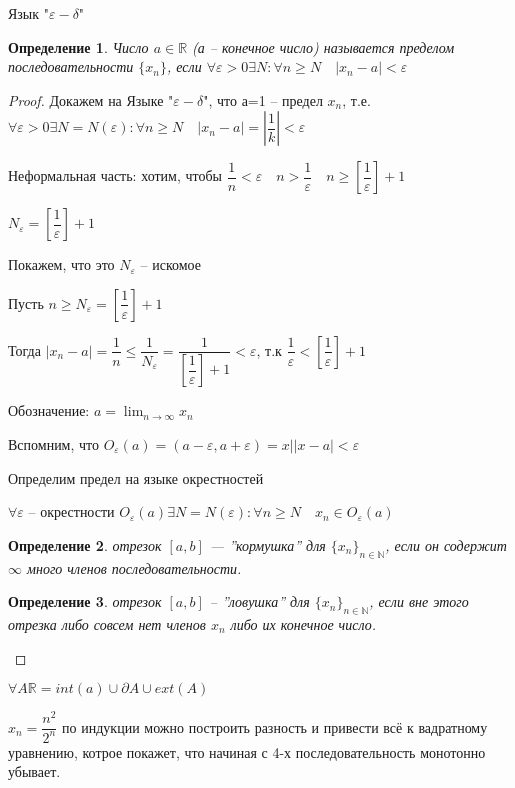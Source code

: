 \documentclass{book}
\newtheorem{Def}{Определение}[chapter]
\begin{document}
Язык  "$\varepsilon - \delta$"

\begin{Def}
	Число $a\in \mathds{R} $ (а -- конечное число) называется пределом последовательности $\{x_n\}$, если $\forall \varepsilon >0\exists N:\forall n \geqslant N \quad |x_n -a|<\varepsilon$
\end{Def}
\begin{proof}
	Докажем на Языке  "$\varepsilon - \delta$", что а=1 -- предел $x_n$, т.е. $\forall \varepsilon >0 \exists N = N(\varepsilon ):\forall n \geqslant N \quad |x_n -a|= |\dfrac{1}{k}|<\varepsilon$
	
	Неформальная часть: хотим, чтобы $\dfrac{1}{n}<\varepsilon\quad n>\dfrac{1}{\varepsilon}\quad n \geqslant \left[ \dfrac{1}{\varepsilon}\right] +1 $
	
	$N_{\varepsilon} = \left[ \dfrac{1}{\varepsilon}\right] +1$
	
	Покажем, что это  $N_{\varepsilon}$ -- искомое
	
	Пусть $n\geqslant N_{\varepsilon} = \left[ \dfrac{1}{\varepsilon}\right] +1$
	
	Тогда $|x_n-a|=\dfrac{1}{n} \leqslant \dfrac{1}{N_{\varepsilon}} = \dfrac{1}{\left[ \dfrac{1}{\varepsilon}\right] +1}<\varepsilon$, т.к $\dfrac{1}{\varepsilon}<\left[ \dfrac{1}{\varepsilon}\right] +1$
	
	Обозначение: $a = \lim_{n\rightarrow \infty}x_n$
	
	Вспомним, что $O_{\varepsilon}(a)=(a-\varepsilon, a+\varepsilon) = {x||x-a|<\varepsilon}$
	
	Определим предел на языке окрестностей
	
	$\forall \varepsilon$ -- окрестности $O_{\varepsilon}(a)\exists N=N(\varepsilon):\forall n \geqslant N \quad x_n \in O_{\varepsilon}(a)$
	\begin{Def}
		отрезок $[a, b]$ --- ''кормушка'' для $\{x_n\}_{n\in \mathds{N}}$, если он содержит $\infty$ много членов последовательности. 
	\end{Def}
		
	\begin{Def}
		отрезок $[a, b]$ -- ''ловушка'' для $\{x_n\}_{n\in \mathds{N}}$, если вне этого отрезка либо совсем нет членов $x_n$ либо их конечное число.
	\end{Def}
\end{proof}

$\forall A \mathds{R} = int(a) \cup \partial A \cup ext(A)$

$x_n = \dfrac{n^2}{2^n}$ по индукции можно построить разность и привести всё к вадратному уравнению, котрое покажет, что начиная с 4-х последовательность монотонно убывает.
\end{document}
